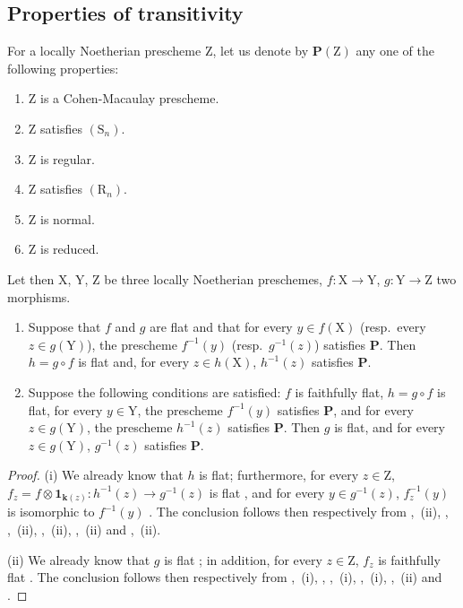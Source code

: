 \subsection{Properties of transitivity}
\label{subsection:IV.6.6}

\begin{proposition}[6.6.1]
\label{IV.6.6.1}
For a locally Noetherian prescheme $\mathrm{Z}$, let us denote by $\boldsymbol{P}(\mathrm{Z})$ any one of the following properties:
\begin{enumerate}[label=\emph{\alph*)}]
  \item $\mathrm{Z}$ is a Cohen-Macaulay prescheme.
  \item $\mathrm{Z}$ satisfies $(\mathrm{S}_n)$.
  \item $\mathrm{Z}$ is regular.
  \item $\mathrm{Z}$ satisfies $(\mathrm{R}_n)$.
  \item $\mathrm{Z}$ is normal.
  \item $\mathrm{Z}$ is reduced.
\end{enumerate}
Let then $\mathrm{X}$, $\mathrm{Y}$, $\mathrm{Z}$ be three locally Noetherian preschemes, $f:\mathrm{X}\to\mathrm{Y}$, $g:\mathrm{Y}\to\mathrm{Z}$ two morphisms.
\begin{enumerate}[label=(\roman*)]
  \item Suppose that $f$ and $g$ are flat and that for every $y\in f(\mathrm{X})$ \textnormal{(}resp.\ every $z\in g(\mathrm{Y})$\textnormal{)}, the prescheme $f^{-1}(y)$ \textnormal{(}resp.\ $g^{-1}(z)$\textnormal{)} satisfies $\boldsymbol{P}$. Then $h=g\circ f$ is flat and, for every $z\in h(\mathrm{X})$, $h^{-1}(z)$ satisfies $\boldsymbol{P}$.

  \item Suppose the following conditions are satisfied: $f$ is faithfully flat, $h=g\circ f$ is flat, for every $y\in\mathrm{Y}$, the prescheme $f^{-1}(y)$ satisfies $\boldsymbol{P}$, and for every $z\in g(\mathrm{Y})$, the prescheme $h^{-1}(z)$ satisfies $\boldsymbol{P}$. Then $g$ is flat, and for every $z\in g(\mathrm{Y})$, $g^{-1}(z)$ satisfies $\boldsymbol{P}$.
\end{enumerate}
\end{proposition}

\begin{proof}
(i) We already know  that $h$ is flat; furthermore, for every $z\in\mathrm{Z}$, $f_z=f\otimes\mathbf{1}_{\boldsymbol{k}(z)}:h^{-1}(z)\to g^{-1}(z)$ is flat , and for every $y\in g^{-1}(z)$, $f_z^{-1}(y)$ is isomorphic to $f^{-1}(y)$ . The conclusion follows then respectively from ,~(ii), , ,~(ii), ,~(ii), ,~(ii) and ,~(ii).

(ii) We already know that $g$ is flat ; in addition, for every $z\in\mathrm{Z}$, $f_z$ is faithfully flat . The conclusion follows then respectively from ,~(i), , ,~(i), ,~(i), ,~(ii) and .
\end{proof}

